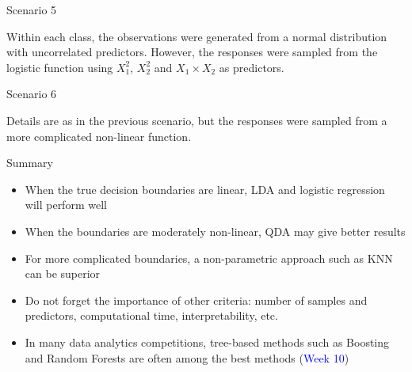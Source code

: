 \documentclass[14pt]{beamer}
\begin{document}
\begin{frame}{Scenario 5}

{\small Within each class, the observations were generated from a normal distribution with uncorrelated predictors. However, the responses were sampled from the logistic function using $X_1^2$, $X_2^2$ and $X_1 \times X_2$ as predictors.}

	
\end{frame}

\begin{frame}{Scenario 6}

Details are as in the previous scenario, but the responses were sampled from a more complicated non-linear function.

	
\end{frame}

\begin{frame}{Summary}\small
	\begin{itemize}
		\item When the true decision boundaries are linear, LDA and logistic regression will perform well
		\item When the boundaries are moderately non-linear, QDA may give better results
		\item For more complicated boundaries, a non-parametric approach such as KNN can be superior
		\item Do not forget the importance of other criteria: number of samples and predictors, computational time, interpretability, etc.
		\item In many data analytics competitions, tree-based methods such as Boosting and Random Forests are often among the best methods (\textcolor{blue}{Week 10})
	\end{itemize}
\end{frame}
\end{document}
